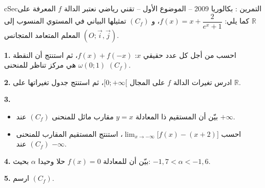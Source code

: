 \documentclass[12pt,a4paper]{article}
\newenvironment{BOX}[2]{\begin{otherlanguage}{english}\begin{arbox}{#1}{#2}}{\end{arbox}\end{otherlanguage}}
\newcounter{exo}
\newenvironment{tamrin}[1]{\stepcounter{exo}\begin{BOX}{cSec}{التمرين \theexo: #1}}{\end{BOX}}
\newcommand{\R}{\mathbb{R}}
\newenvironment{sq}{\begin{itemize}[leftmargin=2.4em,itemsep=3pt]}{\end{itemize}}
\newcommand{\qa}{\item[(أ)]}\newcommand{\qb}{\item[(ب)]}\newcommand{\qc}{\item[(جـ)]}\newcommand{\qd}{\item[(د)]}\newcommand{\qe}{\item[(هـ)]}
\newcommand{\QQ}[1]{\par\smallskip\textbf{#1.} }
\begin{document}
\begin{tamrin}{بكالوريا 2009 -- الموضوع الأول -- تقني رياضي}
نعتبر الدالة $f$ المعرفة على $\R$ كما يلي: $f(x)=x+\dfrac{2}{e^{x}+1}$،
و $(C_f)$ تمثيلها البياني في المستوي المنسوب إلى المعلم المتعامد المتجانس $(O;\vec i,\vec j)$.
\QQ{1} احسب من أجل كل عدد حقيقي $x$: $f(x)+f(-x)$، ثم استنتج أن النقطة $\omega(0;1)$ هي مركز تناظر للمنحنى $(C_f)$.
\QQ{2} ادرس تغيرات الدالة $f$ على المجال $[0;+\infty[$، ثم استنتج جدول تغيراتها على $\R$.
\QQ{3}
\begin{sq}
\qa بيّن أن المستقيم ذا المعادلة $y=x$ مقارب مائل للمنحنى $(C_f)$ عند $+\infty$.
\qb احسب $\displaystyle\lim_{x\to-\infty}\big[f(x)-(x+2)\big]$، استنتج المستقيم المقارب للمنحنى $(C_f)$ عند $-\infty$.
\end{sq}
\QQ{4} بيّن أن للمعادلة $f(x)=0$ حلا وحيدا $\alpha$ بحيث: $-1{,}7<\alpha<-1{,}6$.
\QQ{5} ارسم $(C_f)$.
\end{tamrin}
\end{document}
